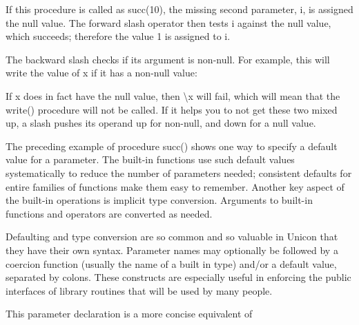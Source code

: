
If this procedure is called as \textsf{succ(10)}, the missing second
parameter, \textsf{i}, is assigned the null value. The forward slash
operator then tests \textsf{i} against the null value, which succeeds;
therefore the value 1 is assigned to \textsf{i}.

The backward slash checks if its argument is non-null. For example, this
will write the value of \textsf{x} if it has a non-null value:


If \textsf{x} does in fact have the null value, then \textsf{{\textbackslash}x} will fail, which will mean
that the \textsf{write()} procedure will not be called. If it helps you
to not get these two mixed up, a slash pushes its operand
{\textquotedbl}up{\textquotedbl} for non-null, and
{\textquotedbl}down{\textquotedbl} for a null value.

The preceding example of procedure \textsf{succ()} shows one way to
specify a default value for a parameter. The built-in functions use
such default values systematically to reduce the number of parameters
needed; consistent defaults for entire families of functions make them
easy to remember. Another key aspect of the built-in operations is
implicit type conversion. Arguments to built-in functions and operators
are converted as needed.

Defaulting and type
conversion are so common and so valuable in Unicon that they have their
own syntax. Parameter names may optionally be followed by a coercion
function (usually the name of a built in type) and/or a default value,
separated by colons. These constructs are especially useful in
enforcing the public interfaces of library routines that will be used
by many people.


\noindent
This parameter declaration is a more concise equivalent of


